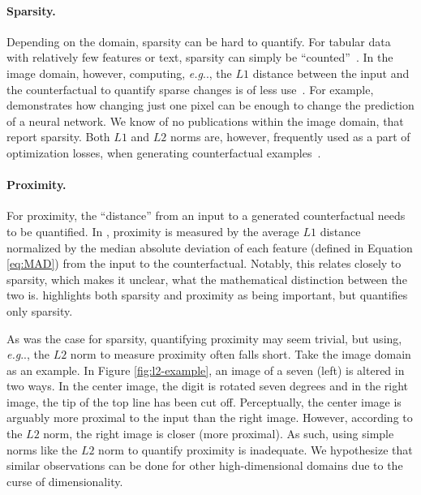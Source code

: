 \documentclass[11pt,a4paper,twoside,openright,final]{memoir}
\makeatletter
\DeclareRobustCommand\onedot{\futurelet\@let@token\@onedot}
\def\@onedot{\ifx\@let@token.\else.\null\fi\xspace}
\def\eg{\emph{e.g}\onedot} \def\Eg{\emph{E.g}\onedot}
\makeatother
\begin{document}
\paragraph{Sparsity.}
Depending on the domain, sparsity can be hard to quantify.
For tabular data with relatively few features or text, sparsity can simply be ``counted''~\cite{Kang2020, Laugel2018}. 
In the image domain, however, computing, \eg, the $L1$ distance between the input and the counterfactual to quantify sparse changes is of less use~\cite{Kang2020}. 
For example, \cite{one-pixel-attack} demonstrates how changing just one pixel can be enough to change the prediction of a neural network.
We know of no publications within the image domain, that report sparsity.
Both $L1$ and $L2$ norms are, however, frequently used as a part of optimization losses, when generating counterfactual examples~\cite{VanLooveren2019, Dhurandhar2018, Wachter2017, Joshi2018, Singla2019}. 

\paragraph{Proximity.}
For proximity, the ``distance'' from an input to a generated counterfactual needs to be quantified.
In \cite{Mothilal2020}, proximity is measured by the average $L1$ distance normalized by the median absolute deviation of each feature (defined in Equation \ref{eq:MAD}) from the input to the counterfactual. 
Notably, this relates closely to sparsity, which makes it unclear, what the mathematical distinction between the two is.
\cite{Mothilal2020} highlights both sparsity and proximity as being important, but quantifies only sparsity.

As was the case for sparsity, quantifying proximity may seem trivial, but using, \eg, the $L2$ norm to measure proximity often falls short.
Take the image domain as an example.
In Figure \ref{fig:l2-example}, an image of a seven (left) is altered in two ways. 
In the center image, the digit is rotated seven degrees and in the right image, the tip of the top line has been cut off.
Perceptually, the center image is arguably more proximal to the input than the right image.
However, according to the $L2$ norm, the right image is closer (more proximal).
As such, using simple norms like the $L2$ norm to quantify proximity is inadequate.
We hypothesize that similar observations can be done for other high-dimensional domains due to the curse of dimensionality.
\end{document}
